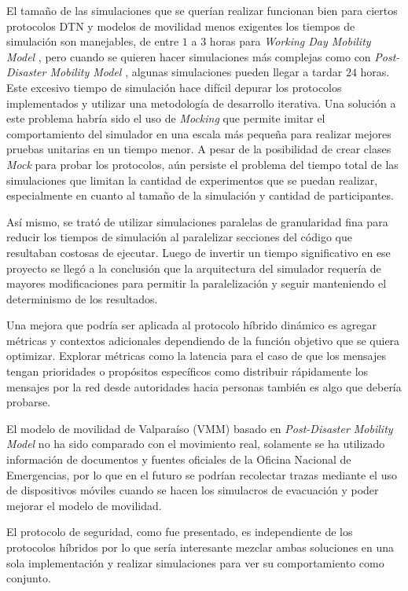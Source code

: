 
El tamaño de las simulaciones que se querían realizar funcionan bien para
ciertos protocolos DTN y modelos de movilidad menos exigentes los tiempos de
simulación son manejables, de entre $1$ a $3$ horas para \textit{Working Day
Mobility Model} \cite{ekman_working_2008}, pero cuando se quieren hacer
simulaciones más complejas como con \textit{Post-Disaster Mobility Model}
\cite{uddin_post-disaster_2009}, algunas simulaciones pueden llegar a tardar
$24$ horas. Este excesivo tiempo de simulación hace difícil depurar los
protocolos implementados y utilizar una metodología de desarrollo iterativa. Una
solución a este problema habría sido el uso de \textit{Mocking} que permite
imitar el comportamiento del simulador en una escala más pequeña para realizar
mejores pruebas unitarias en un tiempo menor. A pesar de la posibilidad de crear
clases \textit{Mock} para probar los protocolos, aún persiste el problema del
tiempo total de las simulaciones que limitan la cantidad de experimentos que se
puedan realizar, especialmente en cuanto al tamaño de la simulación y cantidad
de participantes.



Así mismo, se trató de utilizar simulaciones paralelas de granularidad fina para
reducir los tiempos de simulación al paralelizar secciones del código que
resultaban costosas de ejecutar. Luego de invertir un tiempo significativo en
ese proyecto se llegó a la conclusión que la arquitectura del simulador requería
de mayores modificaciones para permitir la paralelización y seguir manteniendo
el determinismo de los resultados.





Una mejora que podría ser aplicada al protocolo híbrido dinámico es agregar
métricas y contextos adicionales dependiendo de la función objetivo que se
quiera optimizar. Explorar métricas como la latencia para el caso de que los
mensajes tengan prioridades o propósitos específicos como distribuir rápidamente
los mensajes por la red desde autoridades hacia personas también es algo que
debería probarse.


El modelo de movilidad de Valparaíso (VMM) basado en \textit{Post-Disaster
Mobility Model} no ha sido comparado con el movimiento real, solamente se ha
utilizado información de documentos y fuentes oficiales de la Oficina Nacional
de Emergencias, por lo que en el futuro se podrían recolectar trazas mediante el
uso de dispositivos móviles cuando se hacen los simulacros de evacuación y poder
mejorar el modelo de movilidad.

El protocolo de seguridad, como fue presentado, es independiente de los
protocolos híbridos por lo que sería interesante mezclar ambas soluciones en una
sola implementación y realizar simulaciones para ver su comportamiento como
conjunto.
